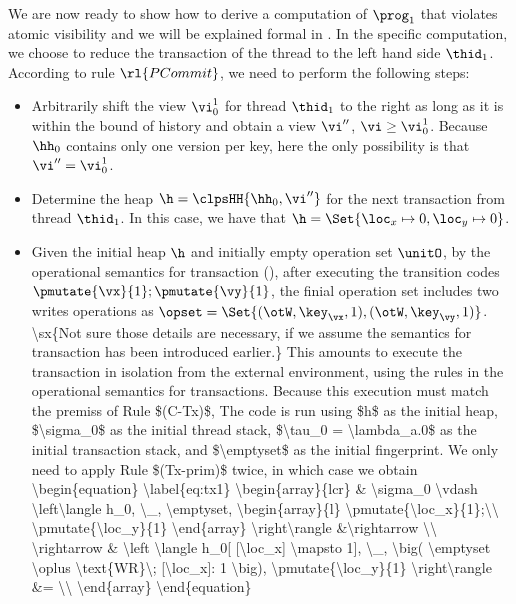 We are now ready to show how to derive a computation of $\prog_1$ that violates atomic visibility and we will be explained formal in .
In the specific computation, we choose to reduce the transaction of the thread to the left hand side $\thid_1$.
According to rule $\rl{PCommit}$, we need to perform the following steps: 
\begin{itemize}
\item Arbitrarily shift the view $\vi_{0}^{1}$ for thread $\thid_1$ to the right as long as it is within the bound of history and obtain a view \(\vi'' \), \ie \( \vi \geq \vi_{0}^{1} \). Because $\hh_0$ contains only one version per key, here the only possibility is that $\vi'' = \vi_{0}^{1}$.
\item Determine the heap $\h = \clpsHH{\hh_0, \vi''}$ for the next transaction from thread $\thid_1$.
In this case, we have that $\h = \Set{\loc_x \mapsto 0, \loc_y \mapsto 0}$.
\item Given the initial heap \( \h \) and initially empty operation set \( \unitO \), by the operational semantics for transaction (), after executing the transition codes \( \pmutate{\vx}{1}; \pmutate{\vy}{1} \), the finial operation set includes two writes operations as $\opset = \Set{(\otW, \key_{\vx}, 1), (\otW, \key_{\vy}, 1)}$.
\ac{
\sx{Not sure those details are necessary, if we assume the semantics for transaction has been introduced earlier.}
This amounts to execute the transaction in isolation from the external environment, using the rules in the operational semantics for 
 transactions. Because this execution must match the premiss of Rule $(C-Tx)$,  The code is run using $h$ as the initial heap, $\sigma_0$ as the initial 
 thread stack, $\tau_0 = \lambda_a.0$ as the initial transaction stack, and $\emptyset$ as the 
 initial fingerprint. We only need to apply 
 Rule $(Tx-prim)$ twice, in which case we obtain
 \begin{equation}
\label{eq:tx1}
\begin{array}{lcr}
& \sigma_0 \vdash \left\langle h_0, \_, \emptyset, \begin{array}{l}
\pmutate{\loc_x}{1};\\ \pmutate{\loc_y}{1} \end{array} \right\rangle 
&\rightarrow \\
\rightarrow & 
\left \langle h_0[ [\loc_x] \mapsto 1], \_, \big( \emptyset \oplus \text{WR}\; [\loc_x]: 1 \big), 
\pmutate{\loc_y}{1} \right\rangle &= \\

\end{array}
\end{equation}}
\end{itemize}
